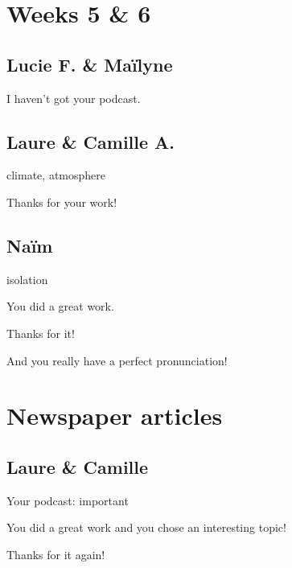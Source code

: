 \documentclass[12pt,oneside]{report}
\begin{document}
\begin{spacing}{1.2}
\section{Weeks 5 \& 6}

\subsection*{Lucie F. \& Maïlyne}

\color{blue}
I haven't got your podcast.
\color{black}

\subsection*{Laure \& Camille A.}

climate, atmosphere

\color{blue}
Thanks for your work!
\color{black}

\subsection*{Naïm}

isolation

\color{blue}
You did a great work.

Thanks for it! 

And you really have a perfect pronunciation!
\color{black}




\section{Newspaper articles}

\subsection*{Laure \& Camille}

Your podcast: important

\color{blue}
You did a great work and you chose an interesting topic!

Thanks for it again!
\color{black}

\end{spacing}
\end{document}
